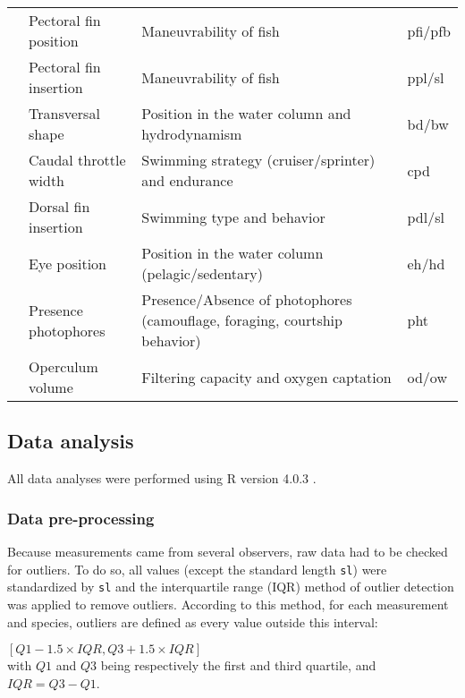 \begin{sidewaystable}
\begin{tabular}{>{\bfseries}lll>{\ttfamily}l}
  &Pectoral fin position & Maneuvrability of fish & pfi/pfb \\ 
  &Pectoral fin insertion & Maneuvrability of fish & ppl/sl \\ 
  &Transversal shape & Position in the water column and hydrodynamism & bd/bw \\ 
  &Caudal throttle width & Swimming strategy (cruiser/sprinter) and endurance & cpd \\ 
  &Dorsal fin insertion & Swimming type and behavior & pdl/sl \\ 
\midrule
  \multirow{2}{*}{Habitat} &Eye position & Position in the water column (pelagic/sedentary) & eh/hd \\ 
  &Presence photophores & Presence/Absence of photophores (camouflage, foraging, courtship behavior) & pht \\ 
  &Operculum volume & Filtering capacity and oxygen captation & od/ow \\ 
\bottomrule
\end{tabular}
\end{sidewaystable}

\subsection{Data analysis}
All data analyses were performed using \textsf{R} version 4.0.3 \citep{rcoreteam2021}.


\subsubsection{Data pre-processing}
Because measurements came from several observers, raw data had to be checked for outliers. To do so, all values (except the standard length \texttt{sl}) were standardized by \texttt{sl} and the interquartile range (IQR) method of outlier detection was applied to remove outliers. According to this method, for each measurement and species, outliers are defined as every value outside this interval: 
\begin{center}
$ [Q1 - 1.5 \times IQR, Q3 + 1.5 \times IQR]$ \\
with $Q1$ and $Q3$ being respectively the first and third quartile, and $IQR = Q3 - Q1$. 
\end{center}{}

